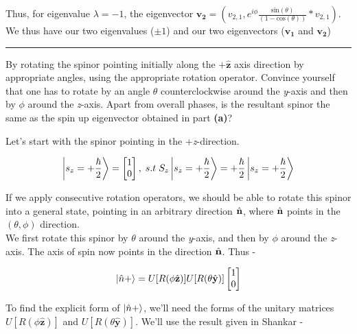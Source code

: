 \begin{alphaparts}
Thus, for eigenvalue $\lambda = -1$, the eigenvector $\mathbf{v_{2}} = (v_{2,1}, e^{i\phi}\frac{\textrm{sin}(\theta)}{(1 - \textrm{cos}(\theta))}*v_{2,1})$.\\
We thus have our two eigenvalues ($\pm 1$) and our two eigenvectors ($\mathbf{v_{1}}$ and $\mathbf{v_{2}}$) \\
\hrule

\questionpart By rotating the spinor pointing initially along the $+\hat{\mathbf{z}}$ axis direction by appropriate angles, u\textrm{sin}g the appropriate rotation operator. Convince yourself that one has to rotate by an angle $\theta$ counterclockwise around the \textit{y}-axis and then by $\phi$ around the \textit{z}-axis. Apart from overall phases, is the resultant spinor the same as the spin up eigenvector obtained in part \textbf{(a)}? 

Let's start with the spinor pointing in the +\textit{z}-direction.

\begin{equation*}
    \ket{s_{z} = +\frac{\hbar}{2}} = 
    \begin{bmatrix}
        1 \\
        0
    \end{bmatrix}, \; s.t \;  S_{z}\ket{s_{z} = +\frac{\hbar}{2}} = +\frac{\hbar}{2}\ket{s_{z} = +\frac{\hbar}{2}}
\end{equation*}

If we apply consecutive rotation operators, we should be able to rotate this spinor into a general state, pointing in an arbitrary direction $\hat{\textbf{n}}$, where $\hat{\textbf{n}}$ points in the $(\theta, \phi)$ direction. \\
We first rotate this spinor by $\theta$ around the \textit{y}-axis, and then by $\phi$ around the \textit{z}-axis. The axis of spin now points in the direction $\hat{\textbf{n}}$. Thus - 

\begin{equation*}
    \ket{\hat{n}+} = U[R(\phi\hat{\mathbf{z}})]U[R(\theta\hat{\mathbf{y}})]
    \begin{bmatrix}
        1 \\
        0
    \end{bmatrix}
\end{equation*}

To find the explicit form of $\ket{\hat{n}+}$, we'll need the forms of the unitary matrices $U[R(\phi\hat{\mathbf{z}})]$ and $U[R(\theta\hat{\mathbf{y}})]$. We'll use the result given in Shankar - 


\end{alphaparts}
